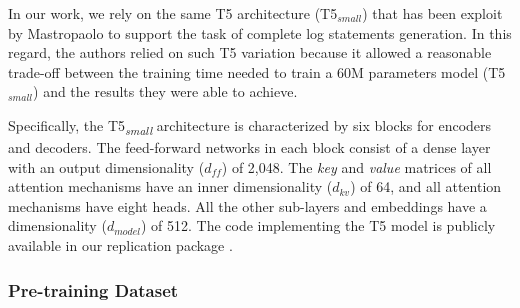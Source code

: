 In our work, we rely on the same T5 architecture (\ie T5$_{small}$) that has been exploit by Mastropaolo \etal \cite{mastropaolo2022using} to support the task of complete log statements generation. In this regard, the authors relied on such T5 variation because it allowed a reasonable trade-off between the training time needed to train a  60M parameters model (\ie T5$_{small}$)  and the results they were able to achieve.
 
Specifically, the T5\textsubscript{\textit{small}} architecture is characterized by six blocks for encoders and decoders. The feed-forward networks in each block consist of a dense layer with an output dimensionality ($d_{ff}$) of 2,048. The \textit{key} and \textit{value} matrices of all attention mechanisms have an inner dimensionality ($d_{kv}$) of 64, and all attention mechanisms have eight heads. All the other sub-layers and embeddings have a dimensionality ($d_{model}$) of 512. The code implementing the T5 model is publicly available in our replication package \cite{replication}.


\subsubsection{Pre-training Dataset}

